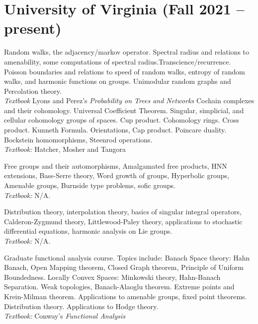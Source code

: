 \documentclass[11pt,letterpaper,sans]{moderncv}
\begin{document}
\section{University of Virginia (Fall 2021 -- present)}
%
  {Random walks, the adjacency/markov operator. Spectral radius and relations to amenability, some computations of spectral radius.Transcience/recurrence. Poisson boundaries and relations to speed of random walks, entropy of random walks, and harmonic functions on groups. Unimodular random graphs and Percolation theory. \\ \emph{Textbook} Lyons and Perez's \emph{Probability on Trees and Networks}}
  {Cochain complexes and their cohomology. Universal Coefficient Theorem. Singular, simplicial, and cellular cohomology groups of spaces. Cup product. Cohomology rings. Cross product. Kunneth Formula. Orientations, Cap product. Poincare duality. Bockstein homomorphisms, Steenrod operations. \\ \emph{Textbook: }Hatcher, Mosher and Tangora}

%
   {Free groups and their automorphisms, Amalgamated free products, HNN extensions, Bass-Serre theory, Word growth of groups, Hyperbolic groups, Amenable groups, Burnside type problems, sofic groups. \\ \emph{Textbook: }N/A.}

%
   {Distribution theory, interpolation theory, basics of singular integral operators, Calderon-Zygmund theory, Littlewood-Paley theory, applications to stochastic differential equations, harmonic analysis on Lie groups.\\ \emph{Textbook: }N/A.}


%
  {Graduate functional analysis course. Topics include: Banach Space theory: Hahn Banach, Open Mapping theorem, Closed Graph theorem, Principle of Uniform Boundedness. Locally Convex Spaces: Minkowski theory, Hahn-Banach Separation. Weak topologies, Banach-Alaoglu theorem. Extreme points and Krein-Milman theorem. Applications to amenable groups, fixed point theorems. Distribution theory. Applications to Hodge theory.\\ \emph{Textbook: }Conway's \emph{Functional Analysis}}
\end{document}
